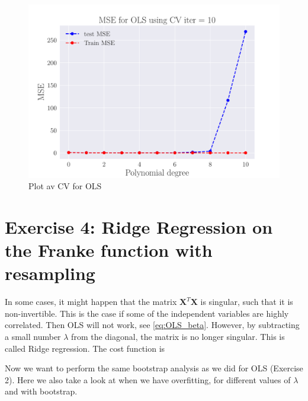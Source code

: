 \documentclass[reprint,english,notitlepage,aps,nobalancelastpage,nofootinbib]{revtex4-1}  %
\begin{document}
\begin{figure}[H]
	\endminipage\hfill
	\includegraphics[width=\linewidth]{MSE_OLS_n30_eps02_pol10_CV_re10.pdf}
	\endminipage
	\caption{Plot av CV for OLS} \label{fig:CV_OLS}
\end{figure}


\section*{Exercise 4: Ridge Regression on the Franke function with resampling}
In some cases, it might happen that the matrix $\mathbf{X}^T\mathbf{X}$ is singular, such that it is non-invertible. This is the case if some of the independent variables are highly correlated. Then OLS will not work, see \eqref{eq:OLS_beta}. However, by subtracting a small number $\lambda$ from the diagonal, the matrix is no longer singular. This is called Ridge regression. The cost function is

Now we want to perform the same bootstrap analysis as we did for OLS (Exercise 2). Here we also take a look at when we have overfitting, for different values of $\lambda$ and with bootstrap.
\end{document}
